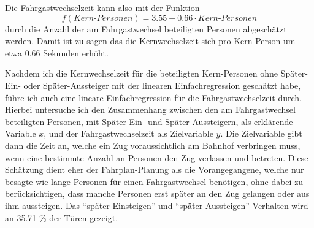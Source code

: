Die Fahrgastwechselzeit kann also mit der Funktion 
\begin{equation}
f(Kern\text{-}Personen) = 3.55 + 0.66 \cdot Kern\text{-}Personen
\end{equation}  
durch die Anzahl der am Fahrgastwechsel beteiligten Personen abgeschätzt werden. Damit ist zu sagen das die Kernwechselzeit sich pro Kern-Person um etwa $0.66$ Sekunden erhöht.

Nachdem ich die Kernwechselzeit für die beteiligten Kern-Personen ohne Später-Ein- oder Später-Aussteiger mit der linearen Einfachregression geschätzt habe, führe ich auch eine lineare Einfachregression für die Fahrgastwechselzeit durch. Hierbei untersuche ich den Zusammenhang zwischen den am Fahrgastwechsel beteiligten Personen, mit Später-Ein- und Später-Aussteigern, als erklärende Variable $x$, und der Fahrgastwechselzeit als Zielvariable $y$. Die Zielvariable gibt dann die Zeit an, welche ein Zug voraussichtlich am Bahnhof verbringen muss, wenn eine bestimmte Anzahl an Personen den Zug verlassen und betreten. Diese Schätzung dient eher der Fahrplan-Planung als die Vorangegangene, welche nur besagte wie lange Personen für einen Fahrgastwechsel benötigen, ohne dabei zu berücksichtigen, dass manche Personen erst später an den Zug gelangen oder aus ihm aussteigen. Das "`später Einsteigen"' und "`später Aussteigen"' Verhalten wird an 35.71 \% der Türen gezeigt.

